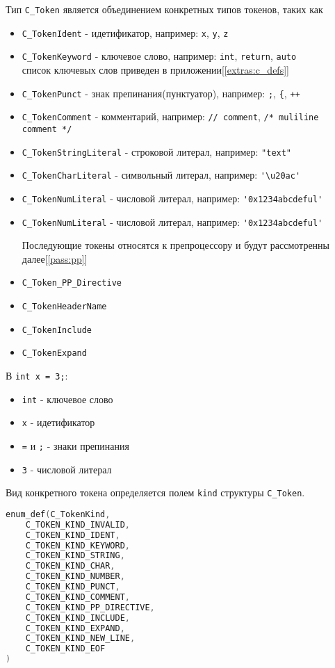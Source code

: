 Тип \verb|C_Token| является объединением конкретных типов токенов, таких как
\begin{itemize}
  \item \verb|C_TokenIdent| - идетификатор, например:
  \verb|x|, \verb|y|, \verb|z|

  \item \verb|C_TokenKeyword| - ключевое слово, например:
  \verb|int|, \verb|return|, \verb|auto| \\
  список ключевых слов приведен в приложении[\ref{extras:c_defs}]

  \item \verb|C_TokenPunct| - знак препинания(пунктуатор), например:
  \verb|;|, \verb|{|, \verb|++|

  \item \verb|C_TokenComment| - комментарий, например:\newline
  \verb|// comment|, \verb|/* muliline comment */|

  \item \verb|C_TokenStringLiteral| - строковой литерал, например: \verb|"text"|
  \item \verb|C_TokenCharLiteral| - символьный литерал, например: \verb|'\u20ac'|
  \item \verb|C_TokenNumLiteral| - числовой литерал, например: \verb|'0x1234abcdeful'|
  \item \verb|C_TokenNumLiteral| - числовой литерал, например: \verb|'0x1234abcdeful'|

  Последующие токены относятся к препроцессору и будут рассмотренны далее[\ref{pass:pp}]
  \item \verb|C_Token_PP_Directive|
  \item \verb|C_TokenHeaderName|
  \item \verb|C_TokenInclude|
  \item \verb|C_TokenExpand|
\end{itemize}

В \verb|int x = 3;|: 
\begin{itemize}
    \item \verb|int| - ключевое слово 
    \item \verb|x| - идетификатор 
    \item \verb|=| и \verb|;| - знаки препинания 
    \item \verb|3| - числовой литерал
\end{itemize}

Вид конкретного токена определяется полем \verb|kind| структуры \verb|C_Token|.
\begin{lstlisting}[language=c, caption={Виды токенов Си}, label={lexing:kind-enum}]
enum_def(C_TokenKind, 
    C_TOKEN_KIND_INVALID,
    C_TOKEN_KIND_IDENT,
    C_TOKEN_KIND_KEYWORD,
    C_TOKEN_KIND_STRING,
    C_TOKEN_KIND_CHAR,
    C_TOKEN_KIND_NUMBER,
    C_TOKEN_KIND_PUNCT,
    C_TOKEN_KIND_COMMENT,
    C_TOKEN_KIND_PP_DIRECTIVE,
    C_TOKEN_KIND_INCLUDE,
    C_TOKEN_KIND_EXPAND,
    C_TOKEN_KIND_NEW_LINE,
    C_TOKEN_KIND_EOF
)
\end{lstlisting}


